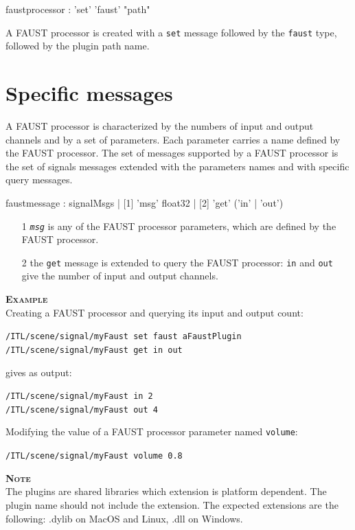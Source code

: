 \documentclass[a4paper,twoside]{report}
\newcommand{\sublevel}[1]	{\section{#1}}
\newcommand{\OSC}[1]		{\texttt{#1}}
\newcommand{\example}		{\textbf{\hspace{-1.5cm}\textbf{\textsc{Example }}}}
\newcommand{\note}	[1]		{\vspace{2mm}\textbf{\hspace{-1.03cm}\textbf{\textsc{Note #1}}}}
\newcommand{\sample}	[1]			{\vspace{-2mm}\begin{center}\colorbox{mygrey}{
								\begin{minipage}[t]{0.9\columnwidth} 
								{\small \texttt{#1}}
								\end{minipage}}\end{center}}
\newcommand{\sampleindent}	{ \hspace{0.5cm} }
\begin{document}
\begin{rail}
faustprocessor : 'set' 'faust' "path"
\end{rail}
A FAUST processor is created with a \OSC{set} message followed by the \OSC{faust} type, followed by the plugin path name. 


\sublevel{Specific messages}
\label{faustmsg}
A FAUST processor is characterized by the numbers of input and output channels and by a set of parameters. Each parameter carries a name defined by the FAUST processor. The set of messages supported by a FAUST processor is the set of signals messages extended with the parameters names and with specific query messages. 

\begin{rail}
faustmessage : signalMsgs
			 | [1] 'msg' float32
			 | [2] 'get' ('in' | 'out')
\end{rail}

\begin{itemize}
\item [1] \OSC{\emph{msg}} is any of the FAUST processor parameters, which are defined by the FAUST processor.
\item [2] the \OSC{get} message is extended to query the FAUST processor: \OSC{in} and \OSC{out} give the number of input and output channels.
\end{itemize}

\example \\
Creating a FAUST processor and querying its input and output count:
\sample{/ITL/scene/signal/myFaust set faust aFaustPlugin \\
/ITL/scene/signal/myFaust get in out
}
\sampleindent gives as output:
\sample{/ITL/scene/signal/myFaust in 2 \\
/ITL/scene/signal/myFaust out 4
}
Modifying the value of a FAUST processor parameter named \OSC{volume}:
\sample{/ITL/scene/signal/myFaust volume 0.8}

\note{} \\
The plugins are shared libraries which extension is platform dependent. The plugin name should not include the extension. The expected extensions are the following: .dylib on MacOS and Linux, .dll on Windows.
\end{document}

